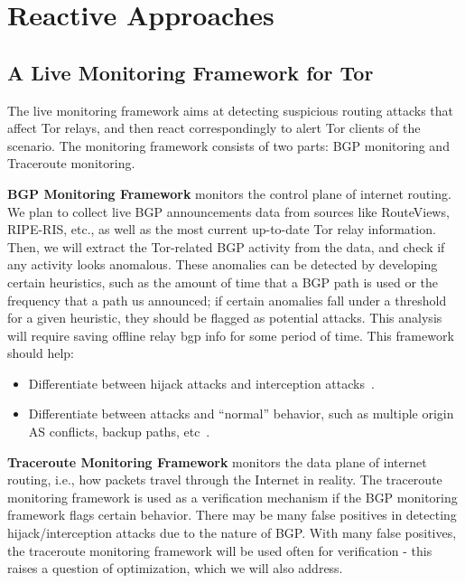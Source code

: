 \section{Reactive Approaches}

\subsection{A Live Monitoring Framework for Tor}
The live monitoring framework aims at detecting suspicious routing attacks that affect Tor relays, and then react correspondingly to alert Tor clients of the scenario. The monitoring framework consists of two parts: BGP monitoring and Traceroute monitoring.

{\bf BGP Monitoring Framework} monitors the control plane of internet routing. We plan to collect live BGP announcements data from sources like RouteViews, RIPE-RIS, etc., as well as the most current up-to-date Tor relay information. Then, we will extract the Tor-related BGP activity from the data, and check if any activity looks anomalous.  These anomalies can be detected by developing certain heuristics, such as the amount of time that a BGP path is used or the frequency that a path us announced; if certain anomalies fall under a threshold for a given heuristic, they should be flagged as potential attacks. This analysis will require saving offline relay bgp info for some period of time.  This framework should help:
\begin{itemize}
\item Differentiate between hijack attacks and interception attacks~\cite{ballani2007study}.
\item Differentiate between attacks and ``normal'' behavior, such as multiple origin AS conflicts, backup paths, etc~\cite{zhao2001analysis}.
\end{itemize}

{\bf Traceroute Monitoring Framework} monitors the data plane of internet routing, i.e., how packets travel through the Internet in reality. The traceroute monitoring framework is used as a verification mechanism if the BGP monitoring framework flags certain behavior. There may be many false positives in detecting hijack/interception attacks due to the nature of BGP.  With many false positives, the traceroute monitoring framework will be used often for verification - this raises a question of optimization, which we will also address.

